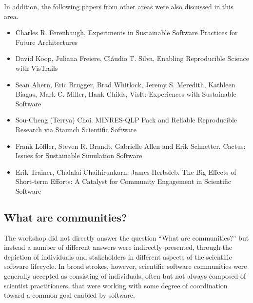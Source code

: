 \documentclass[11pt, oneside]{amsart}
\begin{document}
In addition, the following papers from other areas were also discussed
in this area.

\begin{itemize}

\item Charles R. Ferenbaugh, Experiments in Sustainable Software
  Practices for Future Architectures~\cite{Ferenbaugh_WSSSPE}

\item David Koop, Juliana Freiere, Cl\'{a}udio T. Silva, Enabling
  Reproducible Science with VisTrails~\cite{Koop_WSSSPE}

\item Sean Ahern, Eric Brugger, Brad Whitlock, Jeremy S. Meredith,
  Kathleen Biagas, Mark C. Miller, Hank Childs, VisIt: Experiences
  with Sustainable Software~\cite{Ahern_WSSSPE}

\item Sou-Cheng (Terrya) Choi. MINRES-QLP Pack and Reliable
  Reproducible Research via Staunch Scientific Software~\cite{Choi_WSSSPE}

\item Frank L\"{o}ffler, Steven R. Brandt, Gabrielle Allen and Erik
  Schnetter. Cactus: Issues for Sustainable Simulation Software~\cite{Loffler_WSSSPE}

\item Erik Trainer, Chalalai Chaihirunkarn, James Herbsleb. The Big
  Effects of Short-term Efforts: A Catalyst for Community Engagement
  in Scientific Software~\cite{Trainer_WSSSPE}

\end{itemize}

\subsection{What are communities?}

The workshop did not directly answer the question ``What are communities?'' but
instead a number of different answers were indirectly presented, through the
depiction of individuals and stakeholders in different aspects of the
scientific software lifecycle.  In broad strokes, however, scientific software
communities were generally accepted as consisting of individuals, often but not
always composed of scientist practitioners, that were working with some degree
of coordination toward a common goal enabled by software.
\end{document}
